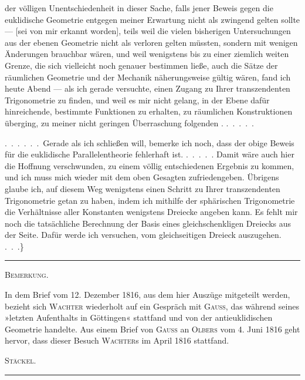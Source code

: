 der völligen Unentschiedenheit in dieser Sache, falls jener
Beweis gegen die euklidische Geometrie entgegen meiner Erwartung nicht
als zwingend gelten sollte --- [sei von mir erkannt worden], teils weil
die vielen bisherigen Untersuchungen aus der ebenen Geometrie nicht
als verloren gelten müssten, sondern mit wenigen Änderungen brauchbar wären,
und weil wenigstens bis zu einer ziemlich weiten Grenze, die sich
vielleicht noch genauer bestimmen ließe, auch die Sätze der räumlichen
Geometrie und der Mechanik näherungsweise gültig wären, fand ich heute
Abend --- als ich gerade versuchte, einen Zugang zu Ihrer
transzendenten Trigonometrie zu finden, und weil es mir nicht gelang,
in der Ebene dafür hinreichende, bestimmte Funktionen zu erhalten,
zu räumlichen Konstruktionen überging, zu meiner nicht geringen
Überraschung folgenden . .\ .\ .\ .\ .

.\ .\ .\ .\ .\ .\ Gerade als ich schließen will, bemerke ich noch, dass der obige
Beweis für die euklidische Parallelentheorie fehlerhaft ist. .\ .\ .\ .\ . Damit wäre
auch hier die Hoffnung verschwunden, zu einem völlig entschiedenen Ergebnis
zu kommen, und ich muss mich wieder mit dem oben Gesagten zufriedengeben.
Übrigens glaube ich, auf diesem Weg wenigstens einen Schritt zu Ihrer
transzendenten Trigonometrie getan zu haben, indem ich mithilfe der
sphärischen Trigonometrie die Verhältnisse aller Konstanten wenigstens
 Dreiecke angeben kann. Es fehlt mir
noch die tatsächliche Berechnung der Basis eines gleichschenkligen Dreiecks aus
der Seite. Dafür werde ich versuchen, vom gleichseitigen Dreieck auszugehen.
.\ .\ .\}

\begin{center}\rule{3cm}{0.4pt}\end{center}

\begin{center}\textsc{Bemerkung.}\end{center}

In dem Brief vom 12. Dezember 1816, aus dem hier Auszüge mitgeteilt werden,
bezieht sich \textsc{Wachter} wiederholt auf ein Gespräch mit \textsc{Gauss},
das während seines »letzten Aufenthalts in Göttingen« stattfand und von der
antieuklidischen Geometrie handelte. Aus einem Brief von
\textsc{Gauss} an \textsc{Olbers} vom 4. Juni 1816 geht hervor, dass dieser
Besuch \textsc{Wachter}s im April 1816 stattfand.

\begin{flushright}\textsc{Stäckel.}\end{flushright}

\begin{center}\rule{3cm}{0.4pt}\end{center}

